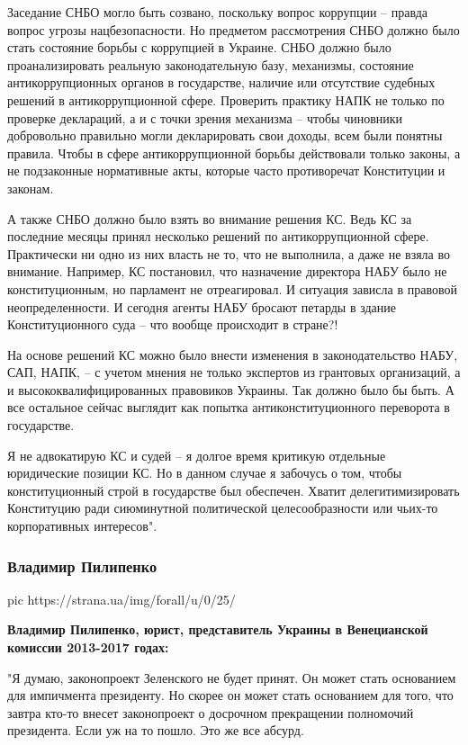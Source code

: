 Заседание СНБО могло быть созвано, поскольку вопрос коррупции – правда вопрос
угрозы нацбезопасности. Но предметом рассмотрения СНБО должно было стать
состояние борьбы с коррупцией в Украине. СНБО должно было проанализировать
реальную законодательную базу, механизмы, состояние антикоррупционных органов в
государстве, наличие или отсутствие судебных решений в антикоррупционной сфере.
Проверить практику НАПК не только по проверке деклараций, а и с точки зрения
механизма – чтобы чиновники добровольно правильно могли декларировать свои
доходы, всем были понятны правила. Чтобы в сфере антикоррупционной борьбы
действовали только законы, а не подзаконные нормативные акты, которые часто
противоречат Конституции и законам.

А также СНБО должно было взять во внимание решения КС. Ведь КС за последние
месяцы принял несколько решений по антикоррупционной сфере. Практически ни одно
из них власть не то, что не выполнила, а даже не взяла во внимание. Например,
КС постановил, что назначение директора НАБУ было не конституционным, но
парламент не отреагировал. И ситуация зависла в правовой неопределенности. И
сегодня агенты НАБУ бросают петарды в здание Конституционного суда – что вообще
происходит в стране?!

На основе решений КС можно было внести изменения в законодательство НАБУ, САП,
НАПК, – с учетом мнения не только экспертов из грантовых организаций, а и
высококвалифицированных правовиков Украины. Так должно было бы быть. А все
остальное сейчас выглядит как попытка антиконституционного переворота в
государстве.

Я не адвокатирую КС и судей – я долгое время критикую отдельные юридические
позиции КС. Но в данном случае я забочусь о том, чтобы конституционный строй в
государстве был обеспечен. Хватит делегитимизировать Конституцию ради
сиюминутной политической целесообразности или чьих-то корпоративных интересов".

\subsubsection{Владимир Пилипенко}


\ifcmt
	pic https://strana.ua/img/forall/u/0/25/%
\fi

{\bfseries 
Владимир Пилипенко, юрист, представитель Украины в Венецианской комиссии 2013-2017 годах:
}

"Я думаю, законопроект Зеленского не будет принят. Он может стать основанием
для импичмента президенту. Но скорее он может стать основанием для того, что
завтра кто-то внесет законопроект о досрочном прекращении полномочий
президента. Если уж на то пошло. Это же все абсурд.

